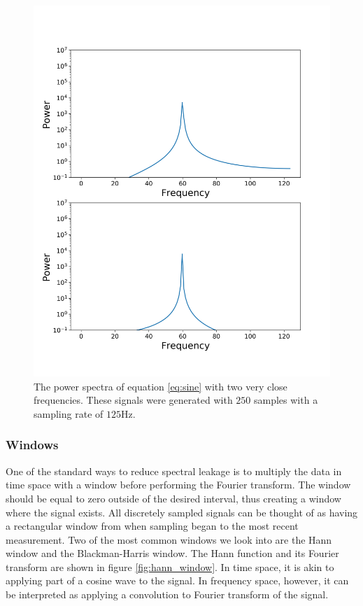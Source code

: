 \message{ !name(Assn2.tex)}\documentclass[twocolumn]{article}
\begin{document}
\begin{figure}
  \includegraphics[width=\linewidth]{power_spectrum.png}
  \caption{
    The power spectra of equation \ref{eq:sine} with two very close
    frequencies. These signals were generated with $250$ samples with
    a sampling rate of $125$Hz.
  }
  \label{}
\end{figure}

\subsubsection{Windows}
One of the standard ways to reduce spectral leakage is to multiply the data in
time space with a window before performing the Fourier transform. The
window should be equal to zero outside of the desired interval, thus
creating a window where the signal exists. All discretely sampled
signals can be thought of as having a rectangular window from when
sampling began to the most recent measurement. Two of the
most common windows we look into are the Hann window and the Blackman-Harris
window. The Hann function and its Fourier transform are shown in figure
\ref{fig:hann_window}. In time space, it is akin to applying part of a
cosine wave to the signal. In frequency space, however, it can be
interpreted as applying a convolution to Fourier transform of the
signal. 
\end{document}
